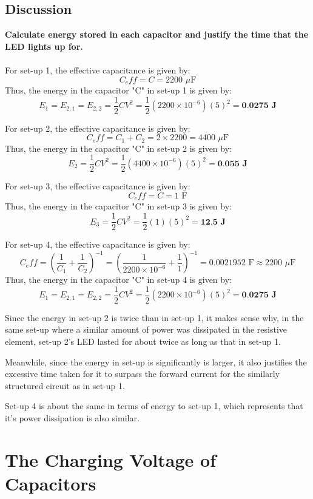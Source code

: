 \documentclass[a4paper,12pt,oneside, tikz]{book}
\begin{document}
\section{Discussion}
\begin{tcolorbox}
    \textbf{Calculate energy stored in each capacitor and justify the time that the LED lights up for.} \\
    \\

    For set-up 1, the effective capacitance is given by:
    $$C_eff = C = \text{2200 }\mu\text{F}$$
    Thus, the energy in the capacitor "C" in set-up 1 is given by:
    $$E_1 = E_{2,1} = E_{2,2} = \frac{1}{2}CV^2 = \frac{1}{2} (2200 \times 10^{-6})(5)^2 = \textbf{0.0275 J}$$

    For set-up 2, the effective capacitance is given by:
    $$C_eff = C_1 + C_2 = 2\times 2200 = \text{4400 }\mu\text{F}$$
    Thus, the energy in the capacitor "C" in set-up 2 is given by:
    $$E_2 = \frac{1}{2}CV^2 = \frac{1}{2} (4400 \times 10^{-6})(5)^2 = \textbf{0.055 J}$$

    For set-up 3, the effective capacitance is given by:
    $$C_eff = C = \text{1 F}$$
    Thus, the energy in the capacitor "C" in set-up 3 is given by:
    $$E_3 = \frac{1}{2}CV^2 = \frac{1}{2} (1)(5)^2 = \textbf{12.5 J}$$

    For set-up 4, the effective capacitance is given by:
    $$C_eff = \left(\frac{1}{C_1} + \frac{1}{C_2}\right)^{-1} = \left(\frac{1}{2200 \times 10^{-6}} + \frac{1}{1}\right)^{-1} = 0.0021952\text{ F} \approx \text{2200 }\mu\text{F}$$
    Thus, the energy in the capacitor "C" in set-up 4 is given by:
    $$E_1 = E_{2,1} = E_{2,2} = \frac{1}{2}CV^2 = \frac{1}{2} (2200 \times 10^{-6})(5)^2 = \textbf{0.0275 J}$$

    Since the energy in set-up 2 is twice than in set-up 1, it makes sense why, in the same set-up where a similar amount of power was dissipated in the resistive element, set-up 2's LED lasted for about twice as long as that in set-up 1.

    Meanwhile, since the energy in set-up is significantly is larger, it also justifies the excessive time taken for it to surpass the forward current for the similarly structured circuit as in set-up 1.

    Set-up 4 is about the same in terms of energy to set-up 1, which represents that it's power dissipation is also similar.
\end{tcolorbox}

\chapter{The Charging Voltage of Capacitors}
\end{document}
